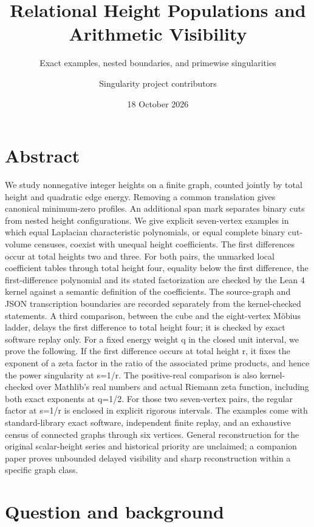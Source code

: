 \documentclass[
  11pt,
  a4paper,
]{article}
\title{Relational Height Populations and Arithmetic Visibility}
\subtitle{Exact examples, nested boundaries, and primewise
singularities}
\author{Singularity project contributors}
\date{18 October 2026}
\begin{document}
\maketitle

\hypertarget{abstract}{%
\section*{Abstract}\label{abstract}}

We study nonnegative integer heights on a finite graph, counted jointly
by total height and quadratic edge energy. Removing a common translation
gives canonical minimum-zero profiles. An additional span mark separates
binary cuts from nested height configurations. We give explicit
seven-vertex examples in which equal Laplacian characteristic
polynomials, or equal complete binary cut-volume censuses, coexist with
unequal height coefficients. The first differences occur at total
heights two and three. For both pairs, the unmarked local coefficient
tables through total height four, equality below the first difference,
the first-difference polynomial and its stated factorization are checked
by the Lean 4 kernel against a semantic definition of the coefficients.
The source-graph and JSON transcription boundaries are recorded
separately from the kernel-checked statements. A third comparison,
between the cube and the eight-vertex Möbius ladder, delays the first
difference to total height four; it is checked by exact software replay
only. For a fixed energy weight q in the closed unit interval, we prove
the following. If the first difference occurs at total height r, it
fixes the exponent of a zeta factor in the ratio of the associated prime
products, and hence the power singularity at s=1/r. The positive-real
comparison is also kernel-checked over Mathlib's real numbers and actual
Riemann zeta function, including both exact exponents at q=1/2. For
those two seven-vertex pairs, the regular factor at s=1/r is enclosed in
explicit rigorous intervals. The examples come with standard-library
exact software, independent finite replay, and an exhaustive census of
connected graphs through six vertices. General reconstruction for the
original scalar-height series and historical priority are unclaimed; a
companion paper proves unbounded delayed visibility and sharp
reconstruction within a specific graph class.

\hypertarget{question-and-background}{%
\section{Question and background}\label{question-and-background}}
\end{document}
